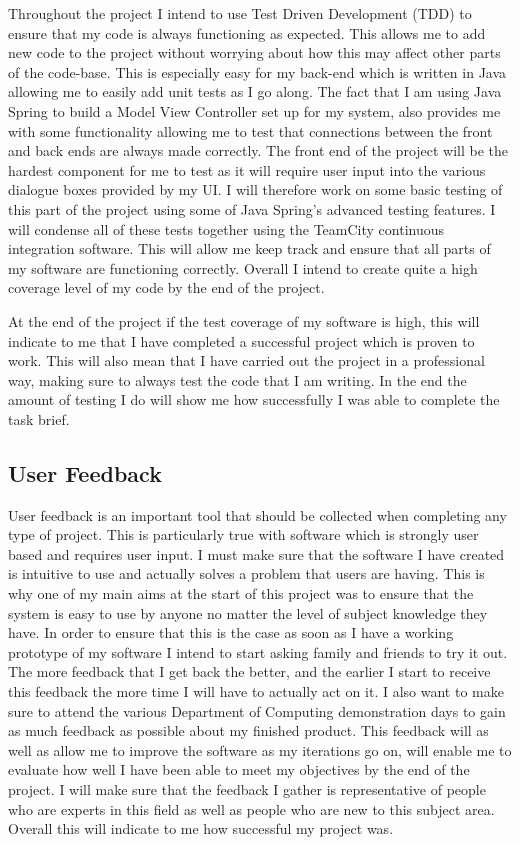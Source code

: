 Throughout the project I intend to use Test Driven Development (TDD) to ensure that my code is always functioning as expected. This allows me to add new code to the project without worrying about how this may affect other parts of the code-base. This is especially easy for my back-end which is written in Java allowing me to easily add unit tests as I go along. The fact that I am using Java Spring to build a Model View Controller set up for my system, also provides me with some functionality allowing me to test that connections between the front and back ends are always made correctly. The front end of the project will be the hardest component for me to test as it will require user input into the various dialogue boxes provided by my UI. I will therefore work on some basic testing of this part of the project using some of Java Spring's advanced testing features. I will condense all of these tests together using the TeamCity continuous integration software. This will allow me keep track and ensure that all parts of my software are functioning correctly. Overall I intend to create quite a high coverage level of my code by the end of the project. 

At the end of the project if the test coverage of my software is high, this will indicate to me that I have completed a successful project which is proven to work. This will also mean that I have carried out the project in a professional way, making sure to always test the code that I am writing. In the end the amount of testing I do will show me how successfully I was able to complete the task brief.

\subsection{User Feedback}

User feedback is an important tool that should be collected when completing any type of project. This is particularly true with software which is strongly user based and requires user input. I must make sure that the software I have created is intuitive to use and actually solves a problem that users are having. This is why one of my main aims at the start of this project was to ensure that the system is easy to use by anyone no matter the level of subject knowledge they have. In order to ensure that this is the case as soon as I have a working prototype of my software I intend to start asking family and friends to try it out. The more feedback that I get back the better, and the earlier I start to receive this feedback the more time I will have to actually act on it. I also want to make sure to attend the various Department of Computing demonstration days to gain as much feedback as possible about my finished product. This feedback will as well as allow me to improve the software as my iterations go on, will enable me to evaluate how well I have been able to meet my objectives by the end of the project. I will make sure that the feedback I gather is representative of people who are experts in this field as well as people who are new to this subject area. Overall this will indicate to me how successful my project was.

